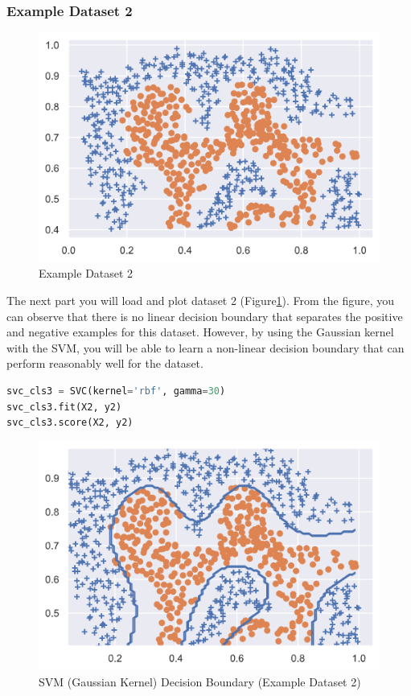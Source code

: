 \documentclass[12pt]{article}
\begin{document}
\subsubsection{Example Dataset 2}

\begin{figure}[h!]
  \centering
  \includegraphics[scale=0.6]{scatter2.png}
  \caption{Example Dataset 2}
  \label{fig:scatter2}
\end{figure}

The next part you will load and plot dataset 2 (Figure\ref{fig:scatter2}). From the figure, you can observe that there is no linear decision boundary that separates the positive and negative examples for this dataset. However, by using the Gaussian kernel with the SVM, you will be able to learn a non-linear decision boundary that can perform reasonably well for the dataset.

\begin{lstlisting}[language=Python]
svc_cls3 = SVC(kernel='rbf', gamma=30)
svc_cls3.fit(X2, y2)
svc_cls3.score(X2, y2)
\end{lstlisting}


\begin{figure}[h!]
  \centering
  \includegraphics[scale=0.6]{boundary2.png}
  \caption{SVM (Gaussian Kernel) Decision Boundary (Example Dataset 2)}
  \label{fig:boundary2}
\end{figure}
\end{document}
